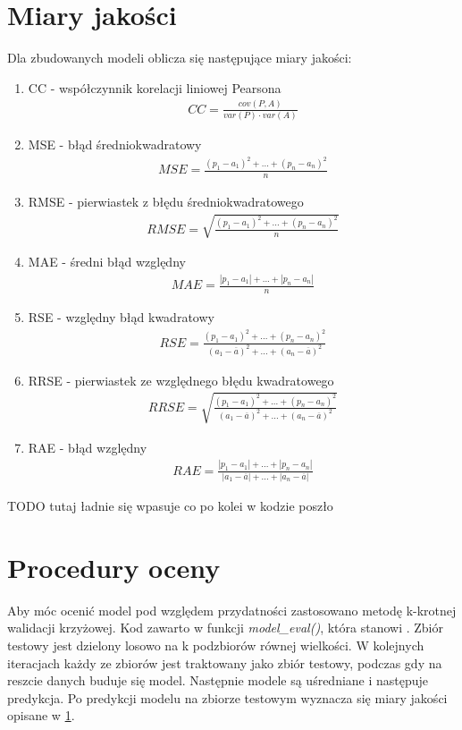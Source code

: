 \documentclass[a4paper,11pt,twoside]{mwrep}  %
\begin{document}
\section{Miary jakości}\label{sect:ocenamodeli}
Dla zbudowanych modeli oblicza się następujące miary jakości:
\begin{enumerate}
\item
CC - współczynnik korelacji liniowej Pearsona\\
\begin{gather*}
	CC =\frac{cov(P,A)}{var(P) \cdot var(A)}
\end{gather*}
\item
MSE - błąd średniokwadratowy
\begin{gather*}
	MSE = \frac{(p_1-a_1)^2+...+(p_n-a_n)^2}{n}
\end{gather*}
\item
RMSE - pierwiastek z błędu średniokwadratowego
\begin{gather*}
	RMSE = \sqrt{\frac{(p_1-a_1)^2+...+(p_n-a_n)^2}{n}}
\end{gather*}
\item
MAE - średni błąd względny
\begin{gather*}
	MAE = \frac{|p_1-a_1|+...+|p_n-a_n|}{n}
\end{gather*}
\item
RSE - względny błąd kwadratowy
\begin{gather*}
	RSE = \frac{(p_1-a_1)^2+...+(p_n-a_n)^2}{(a_1-\overline{a})^2+...+(a_n-\overline{a})^2}
\end{gather*}
\item
RRSE - pierwiastek ze względnego błędu kwadratowego
\begin{gather*}
	RRSE = \sqrt{\frac{(p_1-a_1)^2+...+(p_n-a_n)^2}{(a_1-\overline{a})^2+...+(a_n-\overline{a})^2}}
\end{gather*}
\item
RAE - błąd względny
\begin{gather*}
	RAE = \frac{|p_1-a_1|+...+|p_n-a_n|}{|a_1-\overline{a}|+...+|a_n-\overline{a}|}
\end{gather*}
\end{enumerate}
TODO tutaj ładnie się wpasuje co po kolei w kodzie poszło

\section{Procedury oceny}
Aby móc ocenić model pod względem przydatności zastosowano metodę k-krotnej walidacji krzyżowej. Kod zawarto w funkcji \textit{model\_eval()}, która stanowi . Zbiór testowy jest dzielony losowo na k podzbiorów równej wielkości. W kolejnych iteracjach każdy ze zbiorów jest traktowany jako zbiór testowy, podczas gdy na reszcie danych buduje się model. Następnie modele są uśredniane i następuje predykcja. Po predykcji modelu na zbiorze testowym wyznacza się miary jakości opisane w \ref{sect:ocenamodeli}.      
\end{document}
